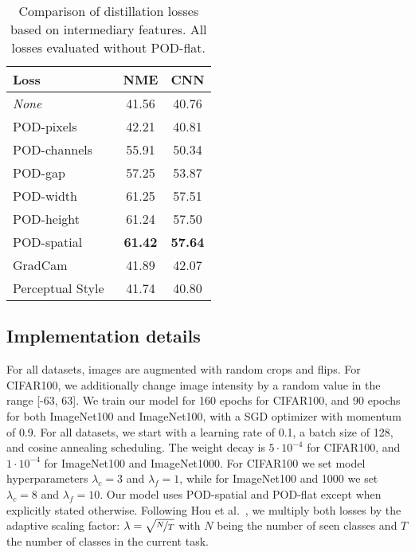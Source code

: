 \documentclass[runningheads]{llncs}
\begin{document}
\begin{table*}[!htbp]
\centering
\caption{Comparison of distillation losses based on intermediary features. All losses evaluated without POD-flat.}
\begin{tabular}{@{}lcc@{}}
 \toprule
 Loss      & NME & CNN\\
 \midrule
 \textit{None}                  & 41.56  & 40.76\\
 POD-pixels                     & 42.21  & 40.81 \\
 POD-channels                   & 55.91  & 50.34\\
 POD-gap                        & 57.25  & 53.87\\
 POD-width                      & 61.25  & 57.51\\
 POD-height                     & 61.24  & 57.50\\
 POD-spatial                    & \textbf{61.42} & \textbf{57.64}\\
 \hdashline
 GradCam~\cite{dhar2019learning_without_memorizing_gradcam}              & 41.89 & 42.07 \\
 Perceptual Style~\cite{johnson2016perceptual_losses}       & 41.74 & 40.80 \\
 \bottomrule
\end{tabular}
\label{tab:ablation_perceptual_noflat}
\end{table*}

\subsection{Implementation details}

For all datasets, images are augmented with random crops and flips. For CIFAR100, we additionally change image intensity by a random value in the range [-63, 63].
We train our model for 160 epochs for CIFAR100, and 90 epochs for both ImageNet100 and ImageNet100, with a SGD optimizer with momentum of 0.9. For all datasets, we start with a learning rate of 0.1, a batch size of 128, and cosine annealing scheduling.
The weight decay is $5\cdot 10^{-4}$ for CIFAR100, and $1\cdot 10^{-4}$ for ImageNet100 and ImageNet1000. For CIFAR100 we set model hyperparameters $\lambda_c = 3$ and $\lambda_f=1$, while for ImageNet100 and 1000 we set $\lambda_c = 8$ and $\lambda_f =10$. Our model uses POD-spatial and POD-flat except when explicitly stated otherwise. Following Hou et al.~\cite{hou2019ucir}, we multiply both losses by the adaptive scaling factor: $\lambda=\sqrt{\nicefrac{N}{T}}$ with $N$ being the number of seen classes and $T$ the number of classes in the current task.
\end{document}
